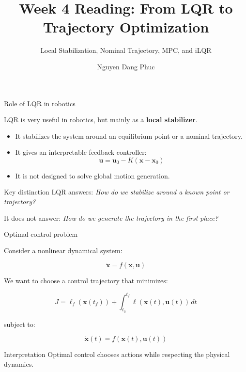\documentclass[aspectratio=169]{beamer}
\title[Week 4 Reading]{Week 4 Reading: From LQR to Trajectory Optimization}
\subtitle{Local Stabilization, Nominal Trajectory, MPC, and iLQR}
\author{Nguyen Dang Phuc}
\date{}
\begin{document}
\begin{frame}
  \titlepage
\end{frame}

\begin{frame}{Role of LQR in robotics}
\large

LQR is very useful in robotics, but mainly as a \textbf{local stabilizer}.

\vspace{0.4cm}

\begin{itemize}
    \item It stabilizes the system around an equilibrium point or a nominal trajectory.
    \item It gives an interpretable feedback controller:
    \[
    \bm{u} = \bm{u}_0 - K(\bm{x}-\bm{x}_0)
    \]
    \item It is not designed to solve global motion generation.
\end{itemize}

\vspace{0.4cm}

\begin{block}{Key distinction}
LQR answers: \textit{How do we stabilize around a known point or trajectory?}

It does not answer: \textit{How do we generate the trajectory in the first place?}
\end{block}

\end{frame}

\begin{frame}{Optimal control problem}
\large

Consider a nonlinear dynamical system:

\[
\dot{\bm{x}} = f(\bm{x}, \bm{u})
\]

We want to choose a control trajectory that minimizes:

\[
J =
\ell_f(\bm{x}(t_f))
+
\int_{t_0}^{t_f}
\ell(\bm{x}(t), \bm{u}(t))\,dt
\]

subject to:

\[
\dot{\bm{x}}(t) = f(\bm{x}(t), \bm{u}(t))
\]

\vspace{0.3cm}

\begin{block}{Interpretation}
Optimal control chooses actions while respecting the physical dynamics.
\end{block}

\end{frame}
\end{document}

